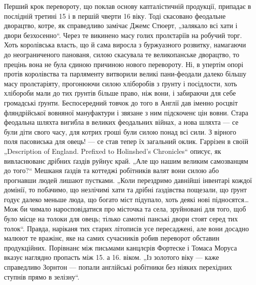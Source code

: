 Перший крок перевороту, що поклав основу капталістичній продукції, припадає в послідній третині 15 і
в першій чверти 16 віку. Тоді скасовано феодальне дворацтво, котре, як справедливо замічає Джемс
Стюерт, „залякало  всі хати і двори безхосенно“. Через те викинено масу голих пролєтаріїв на
робучий торг. Хоть королівська власть, що й сама виросла з буржуазного розвитку, намагаючи до
неограниченого панованя, силою скасувала те великопанське дворацтво, то прецінь вона не була єдиною
причиною нового перевороту. Ні, в упертім опорі протів королівства та
парляменту витворили великі пани-феодали далеко більшу масу пролєтаріяту, прогонюючи силою
хліборобів з ґрунту і посідлости, хоть хлібороби мали до тих ґрунтів більше право, ніж вони, і
забираючи для себе громадські ґрунти. Беспосередний товчок до того в Англії дав іменно росцвіт
фляндрійської вовняної мануфактури і звязане з ним підскоченє цін вовни. Стара феодальна шляхта
вигибла в великих феодальних війнах, а нова шляхта — се були діти свого часу, для котрих гроші були
силою понад всі сили. З вірного поля пасовиська для овець! — се став тепер їх загальний оклик.
Гаррізен в своїй „Description of England. Prefixed to Holinshed’s Chronicles“ описує, як
вивласнюванє дрібних ґаздів руйнує край. „Але що нашим великим самозванцям до того?“ Мешканя ґаздів
та коттеджі робітників валят вони силою або прогнавши людей лишают пустками. „Коли перездримо
давнійші інвентарі кождої домінії, то побачимо, що незлічимі хати та дрібні ґаздівства пощезали, що
ґрунт годує далеко меньше люда, що богато міст підупало, хоть деякі нові підносятся\dots{} Мож би
чимало наросповідатися про місточка та села, зруйновані для того, щоб було місце на толоки для
овець; тілько самотні панські двори стоят серед тих толок“. Правда, наріканя тих старих літописів
усе пересаджені, але вони досадно малюют те вражінє, яке на самих сучасників робив переворот
обставин продукційних. Порівнанє між письмами канцлєрів Фортеске і Томаса Моруса вказує наглядно
пропасть між 15. а 16. віком. „Із золотого віку — каже справедливо Зорнтон — попали англійські
робітники без ніяких перехідних ступнів прямо в зелізну“.

